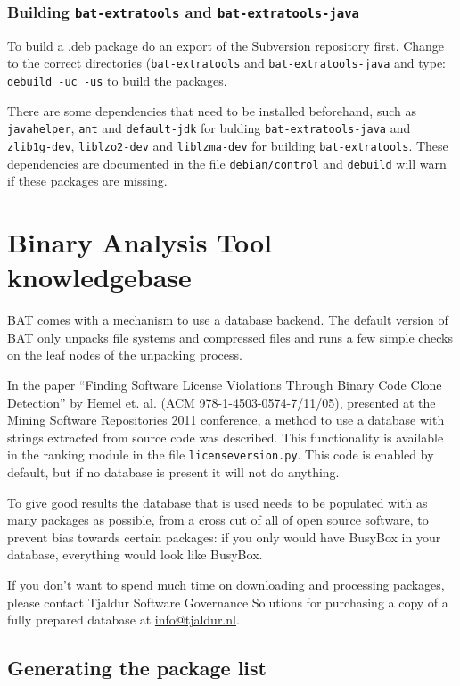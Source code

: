 \documentclass[10pt]{article}
\begin{document}
\subsubsection{Building \texttt{bat-extratools} and
\texttt{bat-extratools-java}}

To build a .deb package do an export of the Subversion repository first. Change
to the correct directories (\texttt{bat-extratools} and 
\texttt{bat-extratools-java} and type: \texttt{debuild -uc -us} to
build the packages.

There are some dependencies that need to be installed beforehand, such as
\texttt{javahelper}, \texttt{ant} and \texttt{default-jdk} for bulding
\texttt{bat-extratools-java} and \texttt{zlib1g-dev}, \texttt{liblzo2-dev}
and \texttt{liblzma-dev} for building \texttt{bat-extratools}. These
dependencies are documented in the file \texttt{debian/control} and
\texttt{debuild} will warn if these packages are missing.

\section{Binary Analysis Tool knowledgebase}

BAT comes with a mechanism to use a database backend. The default version of
BAT only unpacks file systems and compressed files and runs a few simple checks
on the leaf nodes of the unpacking process.

In the paper ``Finding Software License Violations Through Binary Code Clone
Detection'' by Hemel et. al. (ACM 978-1-4503-0574-7/11/05), presented at
the Mining Software Repositories 2011 conference, a method to use a database
with strings extracted from source code was described. This functionality is
available in the ranking module in the file \texttt{licenseversion.py}. This
code is enabled by default, but if no database is present it will not do
anything.

To give good results the database that is used needs to be populated with as
many packages as possible, from a cross cut of all of open source software, to
prevent bias towards certain packages: if you only would have BusyBox in your
database, everything would look like BusyBox.

If you don't want to spend much time on downloading and processing
packages, please contact Tjaldur Software Governance Solutions for
purchasing a copy of a fully prepared database at \url{info@tjaldur.nl}.

\subsection{Generating the package list}
\end{document}
